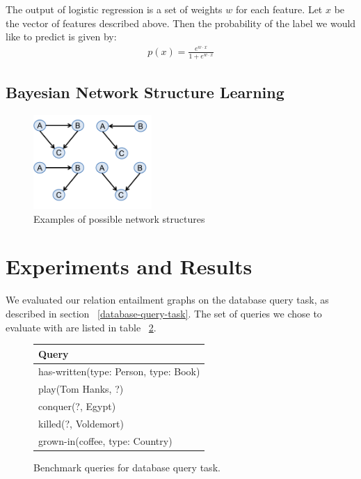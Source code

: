 \documentclass{article}
\begin{document}
The output of logistic regression is a set of weights $w$ for each feature. Let $x$ be the vector of features described above. Then the probability of the label we would like to predict is given by:
\begin{align*}
  p(x) = \frac{e^{w\cdot x}}{1 + e^{w\cdot x}}
\end{align*} 

\subsection{Bayesian Network Structure Learning}

\begin{figure}[h]
\begin{center}
\includegraphics[width=0.4\textwidth]{figures/example-net-structures.pdf}
\end{center}
\caption{Examples of possible network structures}\label{example-net-structures}
\end{figure}


\section{Experiments and Results}
We evaluated our relation entailment graphs on the database query task, as described in section ~\ref{database-query-task}. The set of queries we chose to evaluate with are listed in table ~\ref{benchmark-queries}.

\begin{figure}[h]
  \begin{center}
    \begin{tabular}{ | l | }
      \hline
      Query\\
      \hline
      has-written(type: Person, type: Book)\\
      play(Tom Hanks, ?)\\
      conquer(?, Egypt)\\
      killed(?, Voldemort)\\
      grown-in(coffee, type: Country)\\
      \hline
    \end{tabular}
  \end{center}
  \caption{Benchmark queries for database query task.}\label{benchmark-queries}
\end{figure}
\end{document}

